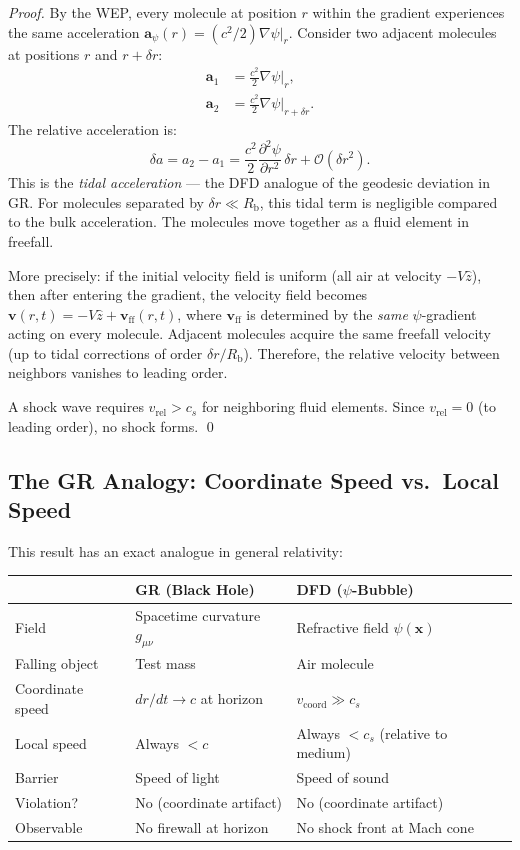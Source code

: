 \documentclass[12pt, letterpaper]{article}
\theoremstyle{definition}
\theoremstyle{remark}
\newcommand{\avec}{\mathbf{a}}
\newcommand{\vvec}{\mathbf{v}}
\newcommand{\xvec}{\mathbf{x}}
\newcommand{\Rbub}{R_{\mathrm{b}}}
\newcommand{\cs}{c_s}
\begin{document}
\begin{proof}
By the WEP, every molecule at position $r$ within the gradient experiences
the same acceleration $\avec_\psi(r) = (c^2/2)\nabla\psi|_r$. Consider two
adjacent molecules at positions $r$ and $r + \delta r$:
\begin{align}
\avec_1 &= \frac{c^2}{2}\nabla\psi\big|_r, \\
\avec_2 &= \frac{c^2}{2}\nabla\psi\big|_{r+\delta r}.
\end{align}
The relative acceleration is:
\begin{equation}
\delta a = a_2 - a_1 = \frac{c^2}{2}\frac{\partial^2\psi}{\partial r^2}\,\delta r
+ \mathcal{O}(\delta r^2).
\label{eq:tidal}
\end{equation}
This is the \emph{tidal acceleration} --- the DFD analogue of the geodesic
deviation in GR. For molecules separated by $\delta r \ll \Rbub$, this tidal
term is negligible compared to the bulk acceleration. The molecules move
together as a fluid element in freefall.

More precisely: if the initial velocity field is uniform (all air at velocity
$-V\hat{z}$), then after entering the gradient, the velocity field becomes
$\vvec(r,t) = -V\hat{z} + \vvec_{\mathrm{ff}}(r,t)$, where $\vvec_{\mathrm{ff}}$
is determined by the \emph{same} $\psi$-gradient acting on every molecule.
Adjacent molecules acquire the same freefall velocity (up to tidal corrections
of order $\delta r / \Rbub$). Therefore, the relative velocity between neighbors
vanishes to leading order.

A shock wave requires $v_{\mathrm{rel}} > \cs$ for neighboring fluid elements.
Since $v_{\mathrm{rel}} = 0$ (to leading order), no shock forms. \qed
\end{proof}

\subsection{The GR Analogy: Coordinate Speed vs.\ Local Speed}

This result has an exact analogue in general relativity:

\begin{center}
\begin{tabular}{lll}
\toprule
& \textbf{GR (Black Hole)} & \textbf{DFD ($\psi$-Bubble)} \\
\midrule
Field & Spacetime curvature $g_{\mu\nu}$ & Refractive field $\psi(\xvec)$ \\
Falling object & Test mass & Air molecule \\
Coordinate speed & $dr/dt \to c$ at horizon & $v_{\mathrm{coord}} \gg \cs$ \\
Local speed & Always $< c$ & Always $< \cs$ (relative to medium) \\
Barrier & Speed of light & Speed of sound \\
Violation? & No (coordinate artifact) & No (coordinate artifact) \\
Observable & No firewall at horizon & No shock front at Mach cone \\
\bottomrule
\end{tabular}
\end{center}
\end{document}
